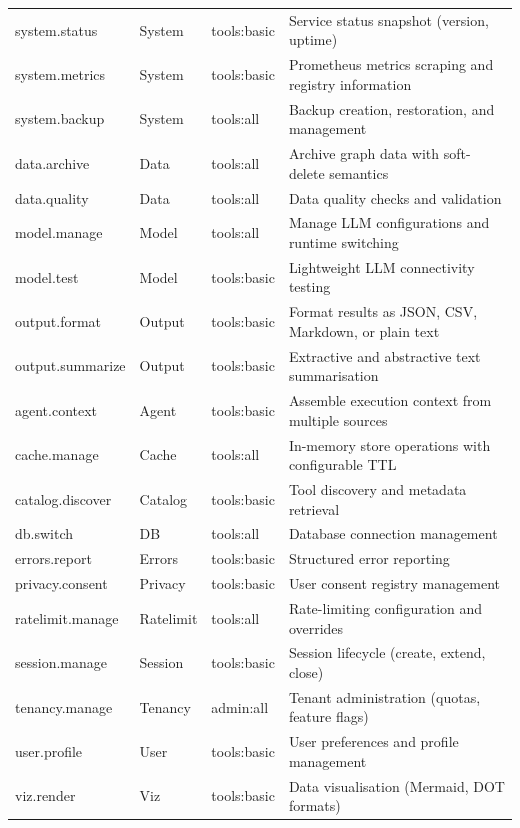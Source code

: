 \documentclass[a4paper,noexaminfo]{sapthesis}
\begin{document}
{\begin{longtable}{@{}l l l p{4.0cm}@{}}
system.status  & System & tools:basic & Service status snapshot (version, uptime) \\
system.metrics & System & tools:basic & Prometheus metrics scraping and registry information \\
system.backup  & System & tools:all   & Backup creation, restoration, and management \\
\hline
data.archive & Data & tools:all   & Archive graph data with soft-delete semantics \\
data.quality & Data & tools:all   & Data quality checks and validation \\
\hline
model.manage & Model & tools:all   & Manage LLM configurations and runtime switching \\
model.test   & Model & tools:basic & Lightweight LLM connectivity testing \\
\hline
output.format    & Output & tools:basic & Format results as JSON, CSV, Markdown, or plain text \\
output.summarize & Output & tools:basic & Extractive and abstractive text summarisation \\
\hline
agent.context    & Agent     & tools:basic & Assemble execution context from multiple sources \\
cache.manage     & Cache     & tools:all   & In-memory store operations with configurable TTL \\
catalog.discover & Catalog   & tools:basic & Tool discovery and metadata retrieval \\
db.switch        & DB        & tools:all   & Database connection management \\
errors.report    & Errors    & tools:basic & Structured error reporting \\
privacy.consent  & Privacy   & tools:basic & User consent registry management \\
ratelimit.manage & Ratelimit & tools:all   & Rate-limiting configuration and overrides \\
session.manage   & Session   & tools:basic & Session lifecycle (create, extend, close) \\
tenancy.manage   & Tenancy   & admin:all   & Tenant administration (quotas, feature flags) \\
user.profile     & User      & tools:basic & User preferences and profile management \\
viz.render       & Viz       & tools:basic & Data visualisation (Mermaid, DOT formats) \\
\hline
\end{longtable}
}
\end{document}

